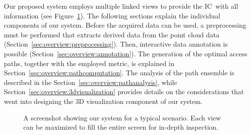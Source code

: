 \documentclass[conference,10pt,letter]{IEEEtran}
\def\IC{IC}
\begin{document}

Our proposed system employs multiple linked views to provide the \IC\ with all information (see Figure~\ref{sec:overview:system}). The following sections explain the individual components of our system. Before the acquired data can be used, a preprocessing must be performed that extracts derived data from the point cloud data (Section~\ref{sec:overview:preprocessing}). Then, interactive data annotation is possible (Section~\ref{sec:overview:annotation}). The generation of the optimal access paths, together with the employed metric, is explained in Section~\ref{sec:overview:pathcomputation}. The analysis of the path ensemble is described in the Section~\ref{sec:overview:pathanalysis}, while Section~\ref{sec:overview:3dvisualization} provides details on the considerations that went into designing the 3D visualization component of our system.

\begin{figure}
    \centering
    \caption{A screenshot showing our system for a typical scenario. Each view can be maximized to fill the entire screen for in-depth inspection.}
    \label{sec:overview:system}
\end{figure}
\end{document}
